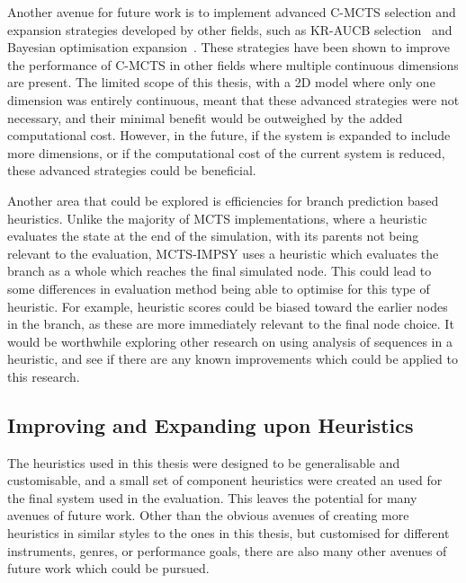 Another avenue for future work is to implement advanced C-MCTS selection and expansion strategies developed by other fields, such as KR-AUCB selection~\citep{Lei2021KBTree} and Bayesian optimisation expansion~\citep{Mern2021BayesianMCTS}. These strategies have been shown to improve the performance of C-MCTS in other fields where multiple continuous dimensions are present. The limited scope of this thesis, with a 2D model where only one dimension was entirely continuous, meant that these advanced strategies were not necessary, and their minimal benefit would be outweighed by the added computational cost. However, in the future, if the system is expanded to include more dimensions, or if the computational cost of the current system is reduced, these advanced strategies could be beneficial.

Another area that could be explored is efficiencies for branch prediction based heuristics. Unlike the majority of MCTS implementations, where a heuristic evaluates the state at the end of the simulation, with its parents not being relevant to the evaluation, MCTS-IMPSY uses a heuristic which evaluates the branch as a whole which reaches the final simulated node. This could lead to some differences in evaluation method being able to optimise for this type of heuristic. For example, heuristic scores could be biased toward the earlier nodes in the branch, as these are more immediately relevant to the final node choice. It would be worthwhile exploring other research on using analysis of sequences in a heuristic, and see if there are any known improvements which could be applied to this research.

\subsection{Improving and Expanding upon Heuristics}
The heuristics used in this thesis were designed to be generalisable and customisable, and a small set of component heuristics were created an used for the final system used in the evaluation. This leaves the potential for many avenues of future work. Other than the obvious avenues of creating more heuristics in similar styles to the ones in this thesis, but customised for different instruments, genres, or performance goals, there are also many other avenues of future work which could be pursued.

